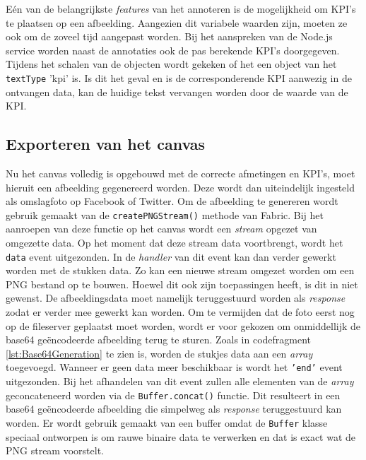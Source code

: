 E\'{e}n van de belangrijkste \textit{features} van het annoteren is de mogelijkheid om KPI's te plaatsen op een afbeelding. Aangezien dit variabele waarden zijn, moeten ze ook om de zoveel tijd aangepast worden. Bij het aanspreken van de Node.js service worden naast de annotaties ook de pas berekende KPI's doorgegeven. Tijdens het schalen van de objecten wordt gekeken of het een object van het \texttt{textType} 'kpi' is. %
Is dit het geval en is de corresponderende KPI aanwezig in de ontvangen data, kan de huidige tekst vervangen worden door de waarde van de KPI. 
 
\subsection{Exporteren van het canvas} \label{ExporterenVanHetCanvas}
Nu het canvas volledig is opgebouwd met de correcte afmetingen en KPI's, moet hieruit een afbeelding gegenereerd worden. Deze wordt dan uiteindelijk ingesteld als omslagfoto op Facebook of Twitter. Om de afbeelding te genereren wordt gebruik gemaakt van de \texttt{createPNGStream()} methode van Fabric. Bij het aanroepen van deze functie op het canvas wordt een \textit{stream} opgezet van omgezette data. %
Op het moment dat deze stream data voortbrengt, wordt het \texttt{data} event uitgezonden. In de \textit{handler} van dit event kan dan verder gewerkt worden met de stukken data. Zo kan een nieuwe stream omgezet worden om een PNG bestand op te bouwen. %
Hoewel dit ook zijn toepassingen heeft, is dit in niet gewenst. De afbeeldingsdata moet namelijk teruggestuurd worden als \textit{response} zodat er verder mee gewerkt kan worden. 
Om te vermijden dat de foto eerst nog op de fileserver geplaatst moet worden, wordt er voor gekozen om onmiddellijk de base64 ge\"{e}ncodeerde afbeelding terug te sturen. Zoals in codefragment \ref{lst:Base64Generation} te zien is, worden de stukjes data aan een \textit{array} toegevoegd. Wanneer er geen data meer beschikbaar is wordt het \texttt{'end'} event uitgezonden. Bij het afhandelen van dit event zullen alle elementen van de \textit{array} geconcateneerd worden via de \texttt{Buffer.concat()} functie. Dit resulteert in een base64 ge\"{e}ncodeerde afbeelding die simpelweg als \textit{response} teruggestuurd kan worden. Er wordt gebruik gemaakt van een buffer omdat de \texttt{Buffer} klasse speciaal ontworpen is om rauwe binaire data te verwerken en dat is exact wat de PNG stream voorstelt. %

